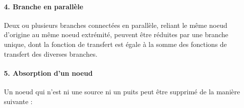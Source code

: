 \begin{center}
\end{center}


\paragraph{4. Branche en parallèle}
Deux ou plusieurs branches connectées en parallèle, reliant le même noeud d'origine au même 
noeud extrémité, peuvent être réduites par une branche unique, dont la fonction de transfert 
est égale à la somme des fonctions de transfert des diverses branches. 

\begin{center}
\end{center}

\paragraph{5. Absorption d'un noeud}
Un noeud qui n'est ni une source ni un puits peut être supprimé de la manière suivante :

\begin{center}
\end{center}

